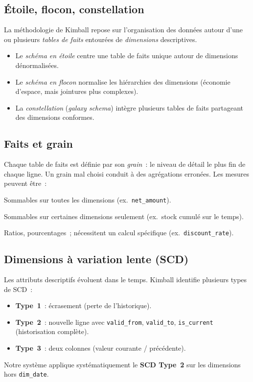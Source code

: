 \documentclass[12pt, a4paper]{report}
\begin{document}
\subsection{Étoile, flocon, constellation}
La méthodologie de Kimball repose sur l'organisation des données autour
d'une ou plusieurs \emph{tables de faits} entourées de \emph{dimensions}
descriptives.
\begin{itemize}
  \item Le \emph{schéma en étoile} centre une table de faits unique
        autour de dimensions dénormalisées.
  \item Le \emph{schéma en flocon} normalise les hiérarchies des
        dimensions (économie d'espace, mais jointures plus complexes).
  \item La \emph{constellation} (\emph{galaxy schema}) intègre plusieurs
        tables de faits partageant des dimensions conformes.
\end{itemize}

\subsection{Faits et grain}
Chaque table de faits est définie par son \emph{grain}~: le niveau de
détail le plus fin de chaque ligne. Un grain mal choisi conduit à des
agrégations erronées. Les mesures peuvent être~:
\begin{description}[leftmargin=2cm]
  \item[Additives.] Sommables sur toutes les dimensions
        (ex.\ \texttt{net\_amount}).
  \item[Semi-additives.] Sommables sur certaines dimensions seulement
        (ex.\ stock cumulé sur le temps).
  \item[Non-additives.] Ratios, pourcentages~; nécessitent un calcul
        spécifique (ex.\ \texttt{discount\_rate}).
\end{description}

\subsection{Dimensions à variation lente (SCD)}
Les attributs descriptifs évoluent dans le temps. Kimball identifie
plusieurs types de \ac{SCD}~:
\begin{itemize}
  \item \textbf{Type~1}~: écrasement (perte de l'historique).
  \item \textbf{Type~2}~: nouvelle ligne avec \texttt{valid\_from},
        \texttt{valid\_to}, \texttt{is\_current} (historisation
        complète).
  \item \textbf{Type~3}~: deux colonnes (valeur courante / précédente).
\end{itemize}
Notre système applique systématiquement le \textbf{\ac{SCD} Type~2} sur
les dimensions hors \texttt{dim\_date}.
\end{document}
